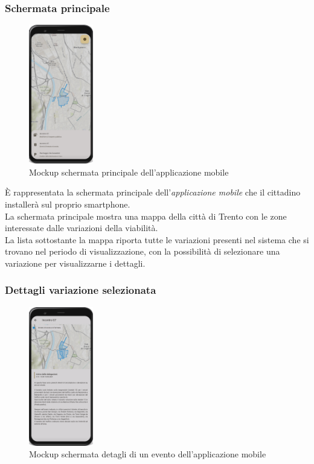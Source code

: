 \documentclass{article}
\begin{document}
\subsubsection{Schermata principale}
\begin{figure}[htbp]
    \label{4.1.1}
    \centering
    \includegraphics[width=0.25\textwidth]{Images/Mockup1 - Mobile.png}
    \caption{Mockup schermata principale dell'applicazione mobile}
\end{figure}

È rappresentata la schermata principale dell'\textit{applicazione mobile} che il cittadino installerà sul proprio smartphone.\\
La schermata principale mostra una mappa della città di Trento con le zone interessate dalle variazioni della viabilità.\\
La lista sottostante la mappa riporta tutte le variazioni presenti nel sistema che si trovano nel periodo di visualizzazione, con la possibilità di selezionare una variazione per visualizzarne i dettagli.\\
\clearpage

\subsubsection{Dettagli variazione selezionata}
\begin{figure}[htbp]
    \label{4.1.2}
    \centering
    \includegraphics[width=0.25\textwidth]{Images/Mockup2 - Mobile.png}
    \caption{Mockup schermata detagli di un evento dell'applicazione mobile}
\end{figure}
\end{document}
